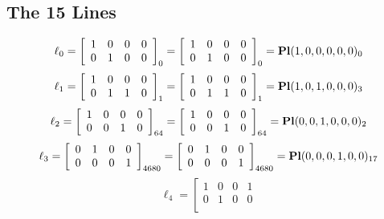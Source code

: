 \documentclass{article}
\begin{document}
{\subsection*{The 15 Lines}
$$
\ell_{0} = 
\left[
\begin{array}{*{4}{r}}
1 & 0 & 0 & 0\\
0 & 1 & 0 & 0\\
\end{array}
\right]
_{0}
=
\left[
\begin{array}{*{4}c}
1  & 0  & 0  & 0\\
0  & 1  & 0  & 0\\
\end{array}
\right]_{0}
={\rm\bf Pl}(1,0,0,0,0,0 )_{0}$$
$$
\ell_{1} = 
\left[
\begin{array}{*{4}{r}}
1 & 0 & 0 & 0\\
0 & 1 & 1 & 0\\
\end{array}
\right]
_{1}
=
\left[
\begin{array}{*{4}c}
1  & 0  & 0  & 0\\
0  & 1  & 1  & 0\\
\end{array}
\right]_{1}
={\rm\bf Pl}(1,0,1,0,0,0 )_{3}$$
$$
\ell_{2} = 
\left[
\begin{array}{*{4}{r}}
1 & 0 & 0 & 0\\
0 & 0 & 1 & 0\\
\end{array}
\right]
_{64}
=
\left[
\begin{array}{*{4}c}
1  & 0  & 0  & 0\\
0  & 0  & 1  & 0\\
\end{array}
\right]_{64}
={\rm\bf Pl}(0,0,1,0,0,0 )_{2}$$
$$
\ell_{3} = 
\left[
\begin{array}{*{4}{r}}
0 & 1 & 0 & 0\\
0 & 0 & 0 & 1\\
\end{array}
\right]
_{4680}
=
\left[
\begin{array}{*{4}c}
0  & 1  & 0  & 0\\
0  & 0  & 0  & 1\\
\end{array}
\right]_{4680}
={\rm\bf Pl}(0,0,0,1,0,0 )_{17}$$
$$
\ell_{4} = 
\left[
\begin{array}{*{4}{r}}
1 & 0 & 0 & 1\\
0 & 1 & 0 & 0\\
\end{array}
$$}
\end{document}
